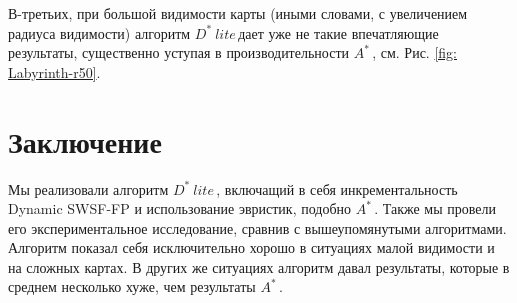 \documentclass[11pt]{article}
\newcommand{\dstarlite}{\(D^*\ lite\)\,}
\newcommand{\astar}{\(A^*\)\,}
\begin{document}
    В-третьих, при большой видимости карты (иными словами, с увеличением радиуса видимости) алгоритм \dstarlite дает уже не такие впечатляющие результаты, существенно уступая в производительности \astar, см. Рис. \ref{fig: Labyrinth-r50}.

    \section{Заключение}
    Мы реализовали алгоритм \dstarlite, включащий в себя инкрементальность Dynamic SWSF-FP и использование эвристик, подобно \astar.
    Также мы провели его экспериментальное исследование, сравнив с вышеупомянутыми алгоритмами.
    Алгоритм показал себя исключительно хорошо в ситуациях малой видимости и на сложных картах.
    В других же ситуациях алгоритм давал результаты, которые в среднем несколько хуже, чем результаты \astar.

    \newpage
    
    
\end{document}
